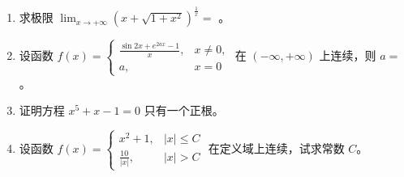 \documentclass[12pt, a4paper]{article}
\newcommand{\blank}[1]{\underline{\hspace{#1}}}
\begin{document}
\begin{enumerate}
    \item 求极限 $ \lim_{x\to+\infty}\left(x+\sqrt{1+x^{2}}\right)^{\frac{1}{x}}= $ \blank{2cm}。

    \item 设函数 $ f(x)=\begin{cases}\frac{\sin2x+e^{2ax}-1}{x}, & x\neq0,\\ a, & x=0\end{cases} $ 在 $ (-\infty,+\infty) $ 上连续，则 $ a= $ \blank{2cm}。

    \item 证明方程 $ x^{5}+x-1=0 $ 只有一个正根。

    \item 设函数 $ f(x)=\begin{cases}x^{2}+1, & |x|\leq C\\ \frac{10}{|x|}, & |x|>C\end{cases} $ 在定义域上连续，试求常数 $C$。
\end{enumerate}
\end{document}
